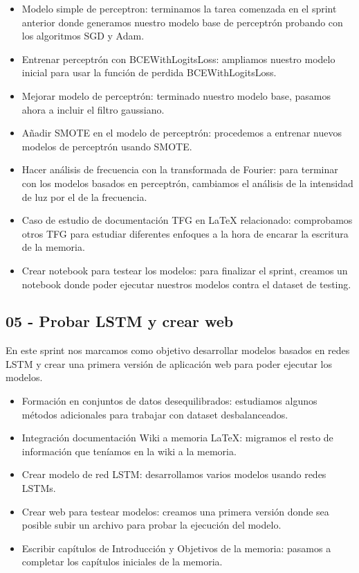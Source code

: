 \begin{itemize}
    \item Modelo simple de perceptron: terminamos la tarea comenzada en el sprint anterior donde generamos nuestro modelo base de perceptrón probando con los algoritmos SGD y Adam.
    \item Entrenar perceptrón con BCEWithLogitsLoss: ampliamos nuestro modelo inicial para usar la función de perdida BCEWithLogitsLoss.
    \item Mejorar modelo de perceptrón: terminado nuestro modelo base, pasamos ahora a incluir el filtro gaussiano.
    \item Añadir SMOTE en el modelo de perceptrón: procedemos a entrenar nuevos modelos de perceptrón usando SMOTE.
    \item Hacer análisis de frecuencia con la transformada de Fourier: para terminar con los modelos basados en perceptrón, cambiamos el análisis de la intensidad de luz por el de la frecuencia.
    \item Caso de estudio de documentación TFG en LaTeX relacionado: comprobamos otros TFG para estudiar diferentes enfoques a la hora de encarar la escritura de la memoria.    
    \item Crear notebook para testear los modelos: para finalizar el sprint, creamos un notebook donde poder ejecutar nuestros modelos contra el dataset de testing.    
\end{itemize}    


\subsection{05 - Probar LSTM y crear web \newline
[21/04/2020 - 04/05/2020]}

En este sprint nos marcamos como objetivo desarrollar modelos basados en redes LSTM y crear una primera versión de aplicación web para poder ejecutar los modelos.

\begin{itemize}
    \item Formación en conjuntos de datos desequilibrados: estudiamos algunos métodos adicionales para trabajar con dataset desbalanceados.
    \item Integración documentación Wiki a memoria LaTeX: migramos el resto de información que teníamos en la wiki a la memoria. 
    \item Crear modelo de red LSTM: desarrollamos varios modelos usando redes LSTMs.
    \item Crear web para testear modelos: creamos una primera versión donde sea posible subir un archivo para probar la ejecución del modelo.    
    \item Escribir capítulos de Introducción y Objetivos de la memoria: pasamos a completar los capítulos iniciales de la memoria.
\end{itemize}


